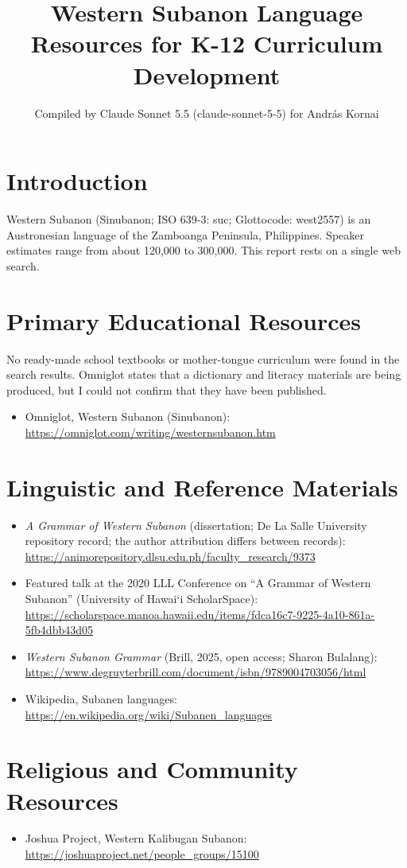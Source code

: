 \documentclass[12pt]{article}
\title{Western Subanon Language Resources for K-12 Curriculum Development}
\author{Compiled by Claude Sonnet 5.5 (claude-sonnet-5-5) for Andr\'as Kornai}
\date{}
\begin{document}
\maketitle

\section{Introduction}
Western Subanon (Sinubanon; ISO 639-3: suc; Glottocode: west2557) is an Austronesian language of the Zamboanga Peninsula, Philippines. Speaker estimates range from about 120,000 to 300,000. This report rests on a single web search.

\section{Primary Educational Resources}
No ready-made school textbooks or mother-tongue curriculum were found in the search results. Omniglot states that a dictionary and literacy materials are being produced, but I could not confirm that they have been published.
\begin{itemize}
\item Omniglot, Western Subanon (Sinubanon): \url{https://omniglot.com/writing/westernsubanon.htm}
\end{itemize}

\section{Linguistic and Reference Materials}
\begin{itemize}
\item \emph{A Grammar of Western Subanon} (dissertation; De La Salle University repository record; the author attribution differs between records): \url{https://animorepository.dlsu.edu.ph/faculty_research/9373}
\item Featured talk at the 2020 LLL Conference on ``A Grammar of Western Subanon'' (University of Hawai\textquoteleft i ScholarSpace): \url{https://scholarspace.manoa.hawaii.edu/items/fdca16c7-9225-4a10-861a-5fb4dbb43d05}
\item \emph{Western Subanon Grammar} (Brill, 2025, open access; Sharon Bulalang): \url{https://www.degruyterbrill.com/document/isbn/9789004703056/html}
\item Wikipedia, Subanen languages: \url{https://en.wikipedia.org/wiki/Subanen_languages}
\end{itemize}

\section{Religious and Community Resources}
\begin{itemize}
\item Joshua Project, Western Kalibugan Subanon: \url{https://joshuaproject.net/people_groups/15100}
\end{itemize}
\end{document}
